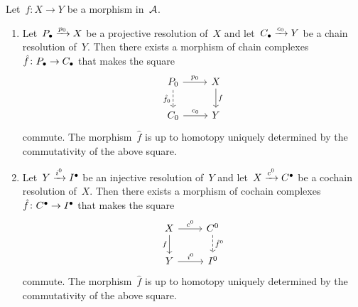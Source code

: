 \begin{theorem}
  \label{comparison theorem}
  Let~$f \colon X \to Y$ be a morphism in~$\mathcal{A}$.
  \begin{enumerate}
    \item
      \label{comparison for projective}
      Let~$P_\bullet \xrightarrow{p_0} X$ be a projective resolution of~$X$ and let~$C_\bullet \xrightarrow{c_0} Y$ be a chain resolution of~$Y$.
      Then there exists a morphism of chain complexes~$\hat{f} \colon P_\bullet \to C_\bullet$ that makes the square
      \begin{equation}
        \label{comparison square for projective}
        \begin{tikzcd}
            P_0
            \arrow{r}[above]{p_0}
            \arrow[dashed]{d}[left]{\hat{f}_0}
          & X
            \arrow{d}[right]{f}
          \\
            C_0
            \arrow{r}[above]{c_0}
          & Y
        \end{tikzcd}
      \end{equation}
      commute.
      The morphism~$\hat{f}$ is up to homotopy uniquely determined  by the commutativity of the above square.
    \item
      \label{comparison for injective}
      Let~$Y \xrightarrow{i^0} I^\bullet$ be an injective resolution of~$Y$ and let~$X \xrightarrow{c^0} C^\bullet$ be a cochain resolution of~$X$.
      Then there exists a morphism of cochain complexes~$\hat{f} \colon C^\bullet \to I^\bullet$ that makes the square
      \begin{equation}
        \label{comparison square for injective}
        \begin{tikzcd}
            X
            \arrow{r}[above]{c^0}
            \arrow{d}[left]{f}
          & C^0
            \arrow[dashed]{d}[right]{\hat{f}^0}
          \\
            Y
            \arrow{r}[above]{i^0}
          & I^0
        \end{tikzcd}
      \end{equation}
      commute.
      The morphism~$\hat{f}$ is up to homotopy uniquely determined by the commutativity of the above square.
  \end{enumerate}
\end{theorem}


